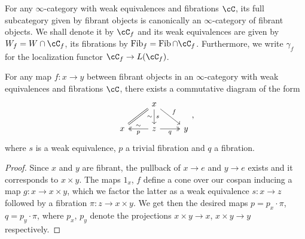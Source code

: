 \begin{construction}
  For any $\infty$-category with weak equivalences and fibrations $\cC$, its
  full subcategory given by fibrant objects is canonically an $\infty$-category
  of fibrant objects. We shall denote it by $\cC_f$ and its weak equivalences
  are given by $W_f=W\cap\cC_f$, its fibrations by $\fib_f=\fib\cap\cC_f$.
  Furthermore, we write $\gamma_f$ for the localization functor
  $\cC_f\rightarrow L(\cC_f)$.
\end{construction}

\begin{lem}\label{7413}

  For any map $f\colon x\rightarrow y$ between fibrant objects in an
  $\infty$-category with weak equivalences and fibrations $\cC$, there exists a
  commutative diagram of the form
  \[\begin{tikzcd}
    & x \\
    x & z & y
    \arrow[Rightarrow, no head, from=1-2, to=2-1]
    \arrow["s", "{\sim}"', from=1-2, to=2-2]
    \arrow["p", "\sim"', two heads, from=2-2, to=2-1]
    \arrow["q"', two heads, from=2-2, to=2-3]
    \arrow["f", from=1-2, to=2-3]
  \end{tikzcd},\]
  where $s$ is a weak equivalence, $p$ a trivial fibration and $q$ a fibration.
\end{lem}
\begin{proof}
  Since $x$ and $y$ are fibrant, the pullback of $x\rightarrow e$ and
  $y\rightarrow e$ exists and it corresponds to $x\times y$. The maps $1_x$,
  $f$ define a cone over our cospan inducing a map $g\colon x\rightarrow
  x\times y$, which we
  factor the latter as a weak equivalence $s\colon x\rightarrow z$ followed by a
  fibration $\pi\colon z\rightarrow x\times y$. We get then the desired maps
  $p=p_x\cdot\pi$, $q=p_y\cdot\pi$, where $p_x$, $p_y$ denote the projections
  $x\times y\rightarrow x$, $x\times y\rightarrow y$ respectively.
\end{proof}

